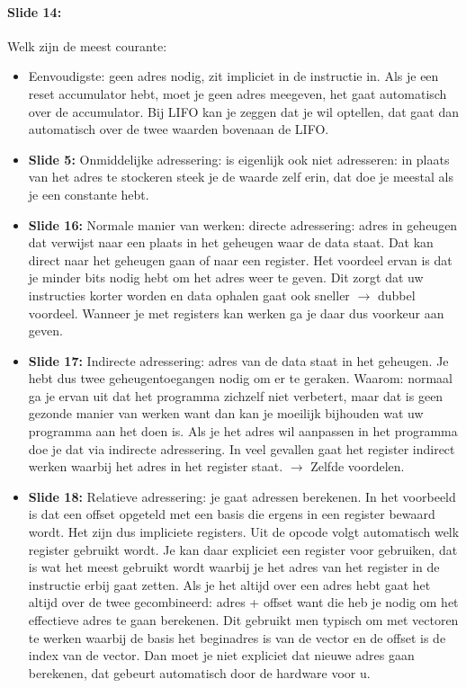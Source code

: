 \documentclass[10pt,a4paper]{book}
\begin{document}
\paragraph{Slide 14:} Welk zijn de meest courante:
\begin{itemize}
\item Eenvoudigste: geen adres nodig, zit impliciet in de instructie in. Als je een reset accumulator hebt, moet je geen adres meegeven, het gaat automatisch over de accumulator. Bij LIFO kan je zeggen dat je wil optellen, dat gaat dan automatisch over de twee waarden bovenaan de LIFO.
\item \textbf{Slide 5:} Onmiddelijke adressering: is eigenlijk ook niet adresseren: in plaats van het adres te stockeren steek je de waarde zelf erin, dat doe je meestal als je een constante hebt. 
\item \textbf{Slide 16:} Normale manier van werken: directe adressering: adres in geheugen dat verwijst naar een plaats in het geheugen waar de data staat. Dat kan direct naar het geheugen gaan of naar een register. Het voordeel ervan is dat je minder bits nodig hebt om het adres weer te geven. Dit zorgt dat uw instructies korter worden en data ophalen gaat ook sneller $\rightarrow$ dubbel voordeel. Wanneer je met registers kan werken ga je daar dus voorkeur aan geven.
\item \textbf{Slide 17:} Indirecte adressering: adres van de data staat in het geheugen. Je hebt dus twee geheugentoegangen nodig om er te geraken. Waarom: normaal ga je ervan uit dat het programma zichzelf niet verbetert, maar dat is geen gezonde manier van werken want dan kan je moeilijk bijhouden wat uw programma aan het doen is. Als je het adres wil aanpassen in het programma doe je dat via indirecte adressering. In veel gevallen gaat het register indirect werken waarbij het adres in het register staat. $\rightarrow$ Zelfde voordelen.	
\item \textbf{Slide 18:} Relatieve adressering: je gaat adressen berekenen. In het voorbeeld is dat een offset opgeteld met een basis die ergens in een register bewaard wordt. Het zijn dus impliciete registers. Uit de opcode volgt automatisch welk register gebruikt wordt. Je kan daar expliciet een register voor gebruiken, dat is wat het meest gebruikt wordt waarbij je het adres van het register in de instructie erbij gaat zetten. Als je het altijd over een adres hebt gaat het altijd over de twee gecombineerd: adres + offset want die heb je nodig om het effectieve adres te gaan berekenen. Dit gebruikt men typisch om met vectoren te werken waarbij de basis het beginadres is van de vector en de offset is de index van de vector. Dan moet je niet expliciet dat nieuwe adres gaan berekenen, dat gebeurt automatisch door de hardware voor u.

\end{itemize}
\end{document}
